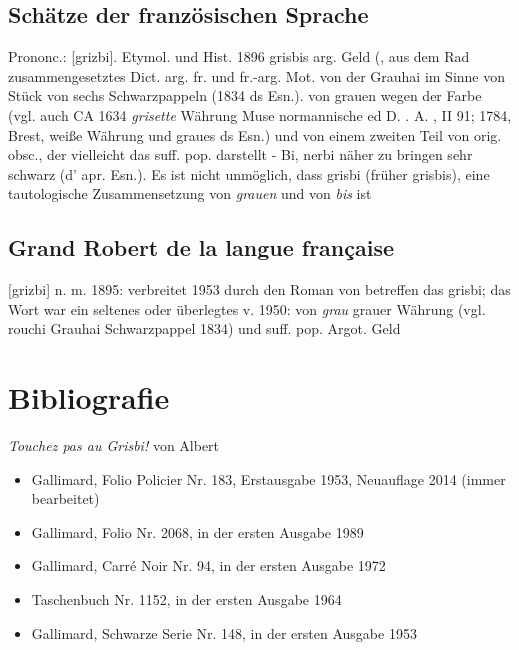 \subsection*{Schätze der französischen Sprache}
Prononc.: [grizbi]. Etymol. und Hist. 1896 grisbis arg. \glqq{}Geld\grqq{} (, aus dem Rad zusammengesetztes Dict. arg. fr. und fr.-arg. Mot. von der Grauhai im Sinne von \glqq{}Stück von sechs Schwarzpappeln\grqq{} (1834 ds Esn.). von grauen wegen der Farbe (vgl. auch CA 1634 \emph{grisette} \glqq{}Währung\grqq{} Muse normannische ed D. . A. , II 91; 1784, Brest, weiße Währung und graues ds Esn.) und von einem zweiten Teil von orig. obsc., der vielleicht das suff. pop. darstellt - Bi, nerbi näher zu bringen \glqq{}sehr schwarz\grqq{} (d' apr. Esn.). Es ist nicht unmöglich, dass grisbi (früher grisbis), eine tautologische Zusammensetzung von \emph{grauen} und von \emph{bis} ist

\subsection*{Grand Robert de la langue française}
[grizbi] n. m. 1895: verbreitet 1953 durch den Roman von  betreffen das grisbi; das Wort war ein seltenes oder überlegtes v. 1950: von \emph{grau} \glqq{}grauer Währung\grqq{} (vgl. rouchi Grauhai \glqq{}Schwarzpappel\grqq{} 1834) und suff. pop. Argot. Geld


\section{Bibliografie\label{preamble-biblio}}

\emph{Touchez pas au Grisbi!} von Albert 

\begin{itemize}
\item Gallimard, Folio Policier Nr. 183, Erstausgabe 1953, Neuauflage 2014 (immer bearbeitet)
\item Gallimard, Folio Nr. 2068, in der ersten Ausgabe 1989
\item Gallimard, Carré Noir Nr. 94, in der ersten Ausgabe 1972
\item Taschenbuch Nr. 1152, in der ersten Ausgabe 1964
\item Gallimard, Schwarze Serie Nr. 148, in der ersten Ausgabe 1953
\end{itemize}


